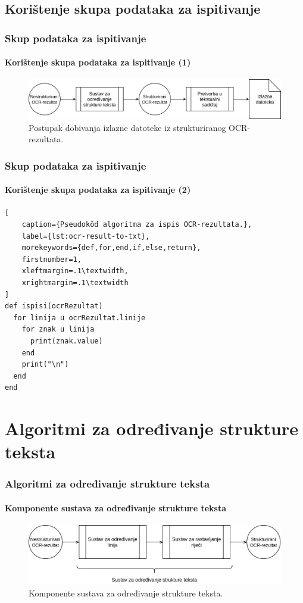 \documentclass{beamer}
\begin{document}
\subsection{Korištenje skupa podataka za ispitivanje}
\begin{frame}
\frametitle{Skup podataka za ispitivanje}
\framesubtitle{Korištenje skupa podataka za ispitivanje (1)}
\begin{figure}[htb]
    \centering
    \includegraphics[width=\textwidth]{images/sustav-02.png}
    \caption{Postupak dobivanja izlazne datoteke iz strukturiranog OCR-rezultata.}
    \label{fig:sustav-02}
\end{figure}
\end{frame}
\begin{frame}[fragile]
\frametitle{Skup podataka za ispitivanje}
\framesubtitle{Korištenje skupa podataka za ispitivanje (2)}
\begin{lstlisting}[
    caption={Pseudokôd algoritma za ispis OCR-rezultata.},
    label={lst:ocr-result-to-txt},
    morekeywords={def,for,end,if,else,return},
    firstnumber=1,
    xleftmargin=.1\textwidth,
    xrightmargin=.1\textwidth
]
def ispisi(ocrRezultat)
  for linija u ocrRezultat.linije
    for znak u linija
      print(znak.value)
    end
    print("\n")
  end
end
\end{lstlisting}
\end{frame}

\section{Algoritmi za određivanje strukture teksta}
\begin{frame}
\frametitle{Algoritmi za određivanje strukture teksta}
\framesubtitle{Komponente sustava za određivanje strukture teksta}
\begin{figure}[htb]
    \centering
    \includegraphics[width=\textwidth]{images/sustav-03.png}
    \caption{Komponente sustava za određivanje strukture teksta.}
    \label{fig:sustav-03}
\end{figure}
\end{frame}
\end{document}

